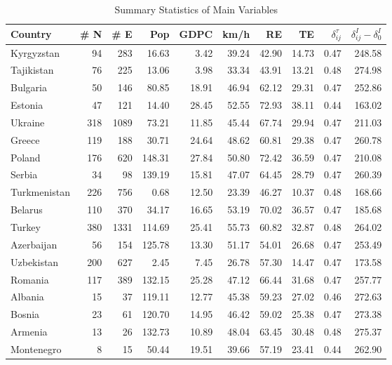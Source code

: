 \documentclass[a4paper]{article}
\begin{document}
\begin{table}[h!]
\centering
\caption{Summary Statistics of Main Variables}
\vspace{2mm}
\label{tab:sstat}
\begin{tabular}{lrrrrrrrrr}
  \toprule
Country & \# N & \# E & Pop & GDPC & km/h & RE & TE & $\delta^\tau_{ij}$ & $\delta^I_{ij}-\delta^I_0$ \\ 
  \midrule
Kyrgyzstan &  94 & 283 & 16.63 & 3.42 & 39.24 & 42.90 & 14.73 & 0.47 & 248.58 \\ 
  Tajikistan &  76 & 225 & 13.06 & 3.98 & 33.34 & 43.91 & 13.21 & 0.48 & 274.98 \\ 
  Bulgaria &  50 & 146 & 80.85 & 18.91 & 46.94 & 62.12 & 29.31 & 0.47 & 252.86 \\ 
  Estonia &  47 & 121 & 14.40 & 28.45 & 52.55 & 72.93 & 38.11 & 0.44 & 163.02 \\ 
  Ukraine & 318 & 1089 & 73.21 & 11.85 & 45.44 & 67.74 & 29.94 & 0.47 & 211.03 \\ 
  Greece & 119 & 188 & 30.71 & 24.64 & 48.62 & 60.81 & 29.38 & 0.47 & 260.78 \\ 
  Poland & 176 & 620 & 148.31 & 27.84 & 50.80 & 72.42 & 36.59 & 0.47 & 210.08 \\ 
  Serbia &  34 &  98 & 139.19 & 15.81 & 47.07 & 64.45 & 28.79 & 0.47 & 260.39 \\ 
  Turkmenistan & 226 & 756 & 0.68 & 12.50 & 23.39 & 46.27 & 10.37 & 0.48 & 168.66 \\ 
  Belarus & 110 & 370 & 34.17 & 16.65 & 53.19 & 70.02 & 36.57 & 0.47 & 185.68 \\ 
  Turkey & 380 & 1331 & 114.69 & 25.41 & 55.73 & 60.82 & 32.87 & 0.48 & 264.02 \\ 
  Azerbaijan &  56 & 154 & 125.78 & 13.30 & 51.17 & 54.01 & 26.68 & 0.47 & 253.49 \\ 
  Uzbekistan & 200 & 627 & 2.45 & 7.45 & 26.78 & 57.30 & 14.47 & 0.47 & 173.58 \\ 
  Romania & 117 & 389 & 132.15 & 25.28 & 47.12 & 66.44 & 31.68 & 0.47 & 257.77 \\ 
  Albania &  15 &  37 & 119.11 & 12.77 & 45.38 & 59.23 & 27.02 & 0.46 & 272.63 \\ 
  Bosnia &  23 &  61 & 120.70 & 14.95 & 46.42 & 59.02 & 25.38 & 0.47 & 273.38 \\ 
  Armenia &  13 &  26 & 132.73 & 10.89 & 48.04 & 63.45 & 30.48 & 0.48 & 275.37 \\ 
  Montenegro &   8 &  15 & 50.44 & 19.51 & 39.66 & 57.19 & 23.41 & 0.44 & 262.90 \\ 

\end{tabular}
\end{table}
\end{document}
